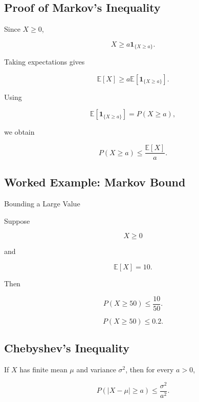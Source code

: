 \subsection{Proof of Markov's Inequality}
\label{subsec:proof-markov}

Since \(X\geq0\),

\[
X
\geq
a\mathbf{1}_{\{X\geq a\}}.
\]

Taking expectations gives

\[
\mathbb{E}[X]
\geq
a
\mathbb{E}
\left[
\mathbf{1}_{\{X\geq a\}}
\right].
\]

Using

\[
\mathbb{E}
\left[
\mathbf{1}_{\{X\geq a\}}
\right]
=
P(X\geq a),
\]

we obtain

\[
\boxed{
P(X\geq a)
\leq
\frac{\mathbb{E}[X]}{a}.
}
\]

\subsection{Worked Example: Markov Bound}
\label{subsec:worked-markov}

\begin{workedexamplebox}{Bounding a Large Value}

Suppose

\[
X\geq0
\]

and

\[
\mathbb{E}[X]=10.
\]

Then

\[
P(X\geq50)
\leq
\frac{10}{50}.
\]

\begin{answerbox}
\[
\boxed{
P(X\geq50)\leq0.2.
}
\]
\end{answerbox}

\end{workedexamplebox}

\subsection{Chebyshev's Inequality}
\label{subsec:chebyshev-inequality}

\begin{theorem}
If \(X\) has finite mean \(\mu\) and variance \(\sigma^2\), then for
every \(a>0\),

\[
\boxed{
P(|X-\mu|\geq a)
\leq
\frac{\sigma^2}{a^2}.
}
\]
\end{theorem}

